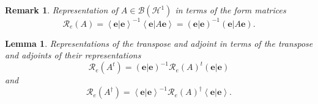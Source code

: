 \documentclass[aps,preprint]{revtex4}%
\newtheorem{lemma}[theorem]{Lemma}
\newtheorem{remark}[theorem]{Remark}
\begin{document}
\begin{remark}
Representation of $A\in\mathcal{B}\left(  \mathcal{H}^{1}\right)  $ in terms
of the form matrices
\begin{equation}
\mathcal{R}_{e}\left(  A\right)  =\left\langle \left.  \mathbf{e}\right\vert
\mathbf{e}\right\rangle ^{-1}\left\langle \left.  \mathbf{e}\right\vert
A\mathbf{e}\right\rangle =\left(  \left.  \mathbf{e}\right\vert \mathbf{e}%
\right)  ^{-1}\left(  \left.  \mathbf{e}\right\vert A\mathbf{e}\right)  .
\end{equation}

\end{remark}

\begin{lemma}
Representations of the transpose and adjoint in terms of the transpose and
adjoints of their representations
\begin{equation}
\mathcal{R}_{e}\left(  A^{t}\right)  =\left(  \left.  \mathbf{e}\right\vert
\mathbf{e}\right)  ^{-1}\mathcal{R}_{e}\left(  A\right)  ^{t}\left(  \left.
\mathbf{e}\right\vert \mathbf{e}\right)
\end{equation}
and
\begin{equation}
\mathcal{R}_{e}\left(  A^{\dagger}\right)  =\left\langle \left.
\mathbf{e}\right\vert \mathbf{e}\right\rangle ^{-1}\mathcal{R}_{e}\left(
A\right)  ^{\dagger}\left\langle \left.  \mathbf{e}\right\vert \mathbf{e}%
\right\rangle .
\end{equation}

\end{lemma}
\end{document}
